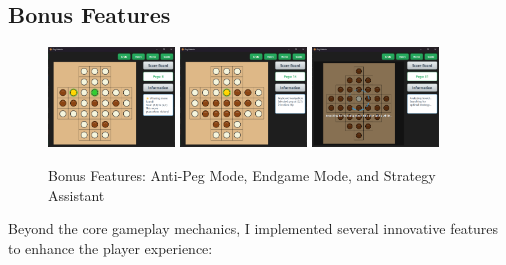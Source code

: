 \subsection{Bonus Features}

\begin{figure}[tbp]
    \centering
    \includegraphics[width=0.3\textwidth]{resource/AntiPegBoard.png}
    \includegraphics[width=0.3\textwidth]{resource/EndgameBoard.png}
    \includegraphics[width=0.3\textwidth]{resource/StrategyAssistant.png}
    \caption{Bonus Features: Anti-Peg Mode, Endgame Mode, and Strategy Assistant}
    \label{fig:bonus-features}
\end{figure}

Beyond the core gameplay mechanics, I implemented several innovative features to enhance the player experience:

